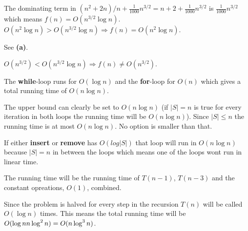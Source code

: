\documentclass[a4paper]{article}
\newenvironment{task}[1]
{
	\begin{description}[align=right]
		\item [#1]
}{		%
	\end{description}
}
\newcommand{\abs}[1]{\left|#1\right|}
\newcommand{\taskref}[1]{\textbf{#1}}
\let\*\relax
\DeclareMathOperator{\*}{\cdot}
\begin{document}
\begin{task}{1. (a)}
	 The dominating term in $(n^2+2n)/n+\frac{1}{1000}n^{3/2}=n+2+\frac{1}{1000}n^{3/2}$ is $\frac{1}{1000}n^{3/2}$ which means $f(n)=O(n^{3/2}\log n)$. $O(n^2\log n)>O(n^{3/2}\log n) \Rightarrow f(n)=O(n^2\log n)$.
\end{task}

\begin{task}{(b)}
 See \taskref{(a)}.
\end{task}

\begin{task}{(c)}
	 $O(n^{3/2})<O(n^{3/2}\log n) \Rightarrow f(n)\neq O(n^{3/2})$.
\end{task}

\begin{task}{2. (a)}
	 The \textbf{while}-loop runs for $O(\log n)$ and the \textbf{for}-loop for $O(n)$ which gives a total running time of $O(n\log n)$.
\end{task}

\begin{task}{3. (a)}
	 The upper bound can clearly be set to $O(n\log n)$ (if $\abs{S}=n$ is true for every iteration in both loops the running time will be $O(n\log n)$). Since $\abs{S}\leq n$ the running time is at most $O(n\log n)$. No option is smaller than that.
\end{task}

\begin{task}{(b)}
	 If either \textbf{insert} or \textbf{remove} has $O(log\abs{S})$ that loop will run in $O(n\log n)$ because $\abs{S}=n$ in between the loops which means one of the loops wont run in linear time.
\end{task}

\begin{task}{4. (a)}
	 The running time will be the running time of $T(n-1)$, $T(n-3)$ and the constant opreations, $O(1)$, combined.
\end{task}

\begin{task}{(b)}
\end{task}

\begin{task}{(c)}
	 Since the problem is halved for every step in the recursion $T(n)$ will be called $O(\log n)$ times. This means the total running time will be $O(\log n \* n\log^2 n)=O(n\log^3 n)$.
\end{task}
\end{document}
